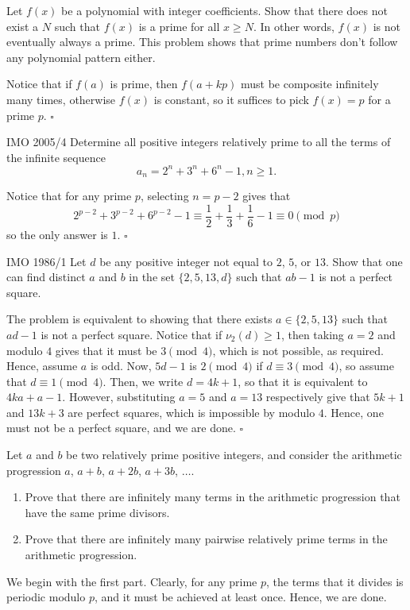 \documentclass{article}
\begin{document}
\begin{problem}[2.14.5]{}
Let $f(x)$ be a polynomial with integer coefficients. Show that there does not exist a $N$ such that $f(x)$ is a prime for all $x \ge N$. In other words, $f(x)$ is not eventually always a prime. This problem shows that prime numbers don't follow any polynomial pattern either.
\end{problem}
Notice that if $f(a)$ is prime, then $f(a+kp)$ must be composite infinitely many times, otherwise $f(x)$ is constant, so it suffices to pick $f(x) = p$ for a prime $p$. $\square$

\begin{problem}[2.14.6]{IMO 2005/4}
Determine all positive integers relatively prime to all the terms of the infinite sequence \[a_n = 2^n + 3^n + 6^n - 1, n \ge 1.\]
\end{problem}
Notice that for any prime $p$, selecting $n = p-2$ gives that \[2^{p-2}+3^{p-2}+6^{p-2}-1 \equiv \dfrac{1}{2}+\dfrac{1}{3}+\dfrac{1}{6}-1 \equiv 0 \pmod{p}\] so the only answer is $\boxed{1}$. $\square$

\begin{problem}[2.14.7]{IMO 1986/1}
Let $d$ be any positive integer not equal to $2$, $5$, or $13$. Show that one can find distinct $a$ and $b$ in the set $\{2, 5, 13, d\}$ such that $ab-1$ is not a perfect square.
\end{problem}

The problem is equivalent to showing that there exists $a \in \{2, 5, 13\}$ such that $ad-1$ is not a perfect square. Notice that if $\nu_2(d) \ge 1$, then taking $a = 2$ and modulo $4$ gives that it must be $3 \pmod{4}$, which is not possible, as required. Hence, assume $a$ is odd. Now, $5d-1$ is $2 \pmod{4}$ if $d \equiv 3 \pmod{4}$, so assume that $d \equiv 1 \pmod{4}$. Then, we write $d = 4k+1$, so that it is equivalent to $4ka+a-1$. However, substituting $a = 5$ and $a = 13$ respectively give that $5k+1$ and $13k+3$ are perfect squares, which is impossible by modulo $4$. Hence, one must not be a perfect square, and we are done. $\square$

\begin{problem}[2.14.8]{}
Let $a$ and $b$ be two relatively prime positive integers, and consider the arithmetic progression $a$, $a + b$, $a + 2b$, $a + 3b$, $\dots$.
\begin{enumerate}
\item Prove that there are infinitely many terms in the arithmetic progression that have the same prime divisors.
\item Prove that there are infinitely many pairwise relatively prime terms in the arithmetic progression.
\end{enumerate}
\end{problem}
We begin with the first part. Clearly, for any prime $p$, the terms that it divides is periodic modulo $p$, and it must be achieved at least once. Hence, we are done.
\end{document}
